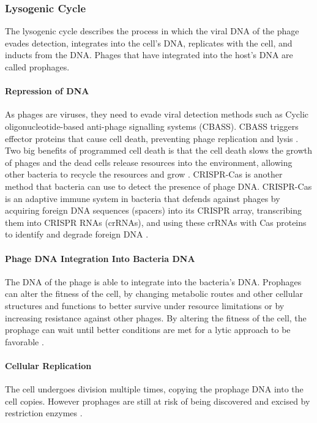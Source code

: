 \subsubsection{Lysogenic Cycle}
The lysogenic cycle describes the process in which the viral DNA of the phage evades detection, integrates into the cell's DNA, replicates with the cell, and inducts from the DNA. 
Phages that have integrated into the host's DNA are called prophages. 
\paragraph{Repression of DNA}
As phages are viruses, they need to evade viral detection methods such as Cyclic oligonucleotide-based anti-phage signalling systems (CBASS). 
CBASS triggers effector proteins that cause cell death, preventing phage replication and lysis \cite{banhBacterialCGASSenses2023}. 
Two big benefits of programmed cell death is that the cell death slows the growth of phages and the dead cells release resources into the environment, allowing other bacteria to recycle the resources and grow \cite{warwick-dugdaleHosthijackingPlanktonicPiracy2019}. \newline
CRISPR-Cas is another method that bacteria can use to detect the presence of phage DNA. 
CRISPR-Cas is an adaptive immune system in bacteria that defends against phages by acquiring foreign DNA sequences (spacers) into its CRISPR array, transcribing them into CRISPR RNAs (crRNAs), and using these crRNAs with Cas proteins to identify and degrade foreign DNA \cite{levyCRISPRAdaptationBiases2015}. 
\paragraph{Phage DNA Integration Into Bacteria DNA}
The DNA of the phage is able to integrate into the bacteria's DNA. 
Prophages can alter the fitness of the cell, by changing metabolic routes and other cellular structures and functions to better survive under resource limitations or by increasing resistance against other phages. 
By altering the fitness of the cell, the prophage can wait until better conditions are met for a lytic approach to be favorable \cite{warwick-dugdaleHosthijackingPlanktonicPiracy2019}. 
\paragraph{Cellular Replication}
The cell undergoes division multiple times, copying the prophage DNA into the cell copies. 
However prophages are still at risk of being discovered and excised by restriction enzymes \cite{sharpMolecularEvolutionBacteriophages1986}. 
